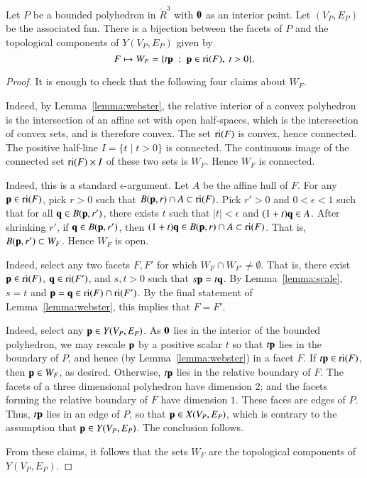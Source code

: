 \begin{lemma}\label{lemma:WF} 
Let $P$ be a bounded polyhedron in $\ring{R}^3$ with ${\mathbf 0}$ as an interior point.  Let $(V_P,E_P)$ be the associated fan.  There is a bijection between the facets of $P$ and the topological components of $Y(V_P,E_P)$ given by 
$$
F \mapsto W_F = \{t {\mathbf p} \ :\  {\mathbf p}\in {\operatorname{ri}}(F),~t >0\}.
$$
\end{lemma}
%

\begin{proof} It is enough to check that the following four claims about  $W_F$.

 Indeed, by Lemma~\ref{lemma:webster}, the relative interior of a convex polyhedron is the intersection of an affine set with open half-spaces, which is the intersection of convex sets, and is therefore convex. The set ${\operatorname{ri}}(F)$ is convex, hence connected.    The positive half-line $I=\{t\mid t>0\}$ is connected.  The continuous image of the connected set ${\operatorname{ri}}(F)\times I$ of these two sets is $W_F$.  Hence $W_F$ is connected.

  Indeed, this is a standard $\epsilon$-argument.  Let $A$ be the affine hull of $F$.  For any ${\mathbf p}\in {\operatorname{ri}}(F)$, pick $r>0$ such that $B({\mathbf p},r)\cap A\subset {\operatorname{ri}}(F)$.  Pick $r'>0$ and $0<\epsilon<1$ such that for all ${\mathbf q}\in B({\mathbf p},r')$, there exists $t$ such that $|t|<\epsilon$ and $(1+t){\mathbf q}\in A$.  After shrinking $r'$,  if ${\mathbf q}\in B({\mathbf p},r')$, then $(1+t){\mathbf q} \in B({\mathbf p},r)\cap A \subset {\operatorname{ri}}(F)$.   That is, $B({\mathbf p},r')\subset W_F$.  Hence $W_F$ is open.

  Indeed, select any two facets $F,F'$ for which $W_F\cap W_{F'}\ne \emptyset$.  That is, there exist ${\mathbf p}\in {\operatorname{ri}}(F)$, ${\mathbf q}\in {\operatorname{ri}}(F')$, and $s,t>0$ such that
$s {\mathbf p} = t {\mathbf q}$.  By Lemma~\ref{lemma:scale}, $s=t$ and ${\mathbf p}={\mathbf q}\in {\operatorname{ri}}(F)\cap {\operatorname{ri}}(F')$.  By the final statement of Lemma~\ref{lemma:webster}, this implies that $F=F'$.

  Indeed, select any ${\mathbf p}\in Y(V_P,E_P)$.  As ${\mathbf 0}$ lies in the interior of the bounded polyhedron, we may rescale ${\mathbf p}$ by a positive scalar $t$ so that $t {\mathbf p}$ lies in the boundary of $P$, and hence (by Lemma~\ref{lemma:webster}) in a facet $F$.  If $t {\mathbf p} \in {\operatorname{ri}}(F)$, then ${\mathbf p}\in W_F$, as desired.  Otherwise, $t {\mathbf p}$ lies in the relative boundary of $F$.  The facets of a three dimensional polyhedron have dimension $2$; and the facets forming the relative boundary of $F$ have dimension $1$.  These faces are edges of $P$.  Thus, $t {\mathbf p}$ lies in an edge of $P$, so that ${\mathbf p}\in X(V_P,E_P)$, which is contrary to the assumption that ${\mathbf p}\in Y(V_P,E_P)$.  The conclusion follows.

From these claims, it follows that the sets $W_F$ are the topological components of $Y(V_P,E_P)$.
\end{proof}
%

